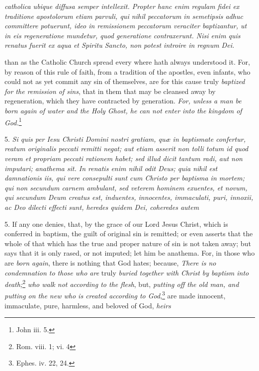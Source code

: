 \emph{catholica ubique diffusa semper intellexit. Propter hanc enim regulam fidei ex traditione apostolorum etiam parvuli, qui nihil peccatorum in semetipsis adhuc committere potuerunt, ideo in remissionem peccatorum veraciter baptizantur, ut in eis regeneratione mundetur, quod generatione contraxerunt. Nisi enim quis renatus fuerit ex aqua et Spiritu Sancto, non potest introire in regnum Dei.}

than as the Catholic Church spread every where hath always understood it. For, by reason of this rule of faith, from a tradition of the apostles, even infants, who could not as yet commit any sin of themselves, are for this cause truly \emph{baptized for the remission of sins}, that in them that may be cleansed away by regeneration, which they have contracted by generation. \emph{For, unless a man be born again of water and the Holy Ghost, he can not enter into the kingdom of God.}\footnote{\par   John iii. 5.}

5. \emph{Si quis per Iesu Christi Domini nostri gratiam, quæ in baptismate confertur, reatum originalis peccati remitti negat; aut etiam asserit non tolli totum id quod veram et propriam peccati rationem habet; sed illud dicit tantum radi, aut non imputari; anathema sit. In renatis enim nihil odit Deus; quia nihil est damnationis iis, qui vere consepulti sunt cum Christo per baptisma in mortem; qui non secundum carnem ambulant, sed veterem hominem exuentes, et novum, qui secundum Deum creatus est, induentes, innocentes, immaculati, puri, innoxii, ac Deo dilecti effecti sunt, heredes quidem Dei, coheredes autem}

5. If any one denies, that, by the grace of our Lord Jesus Christ, which is conferred in baptism, the guilt of original sin is remitted; or even asserts that the whole of that which has the true and proper nature of sin is not taken away; but says that it is only rased, or not imputed; let him be anathema. For, in those who are \emph{born again}, there is nothing that God hates; because, \emph{There is no condemnation to those who are} truly \emph{buried together with Christ by baptism into death;}\footnote{\par   Rom. viii. 1;  vi. 4} \emph{who walk not according to the flesh}, but, \emph{putting off the old man, and putting on the new who is created according to God},\footnote{\par   Ephes. iv. 22, 24.} are made innocent, immaculate, pure, harmless, and beloved of God, \emph{heirs}

